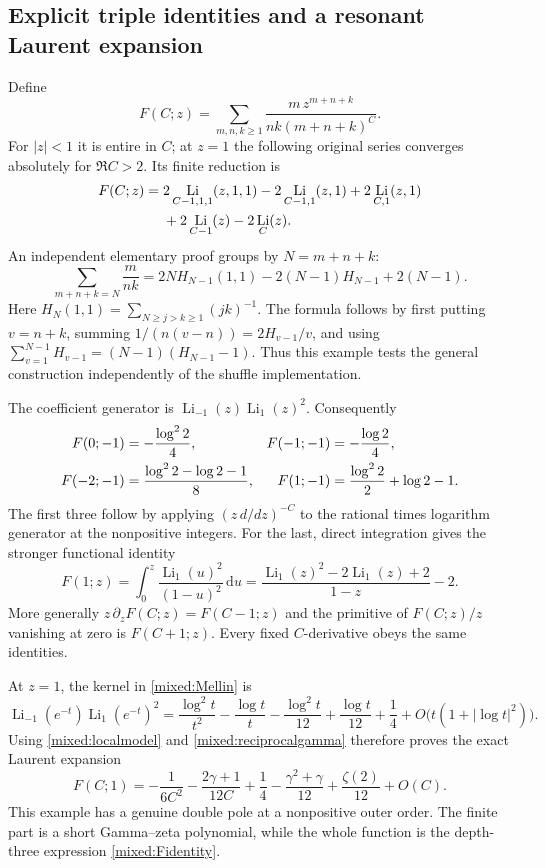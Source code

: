 \documentclass[11pt]{article}
\numberwithin{equation}{section}
\theoremstyle{plain}
\theoremstyle{definition}
\theoremstyle{remark}
\DeclareMathOperator{\Li}{Li}
\newcommand{\dd}{\,\mathrm d}
\begin{document}
\subsection{Explicit triple identities and a resonant Laurent expansion}

Define
\begin{equation}\label{mixed:F}
 F(C;z)=\sum_{m,n,k\ge1}\frac{m\,z^{m+n+k}}{nk(m+n+k)^C}.
\end{equation}
For $|z|<1$ it is entire in $C$; at $z=1$ the following original
series converges absolutely for $\Re C>2$. Its finite reduction is
\begin{align}\label{mixed:Fidentity}
 F(C;z)={}&2\Li_{C-1,1,1}(z,1,1)
          -2\Li_{C-1,1}(z,1)+2\Li_{C,1}(z,1)\notag\\
         &+2\Li_{C-1}(z)-2\Li_C(z).
\end{align}
An independent elementary proof groups by $N=m+n+k$:
\[
 \sum_{m+n+k=N}\frac m{nk}
 =2N H_{N-1}(1,1)-2(N-1)H_{N-1}+2(N-1).
\]
Here $H_N(1,1)=\sum_{N\ge j>k\ge1}(jk)^{-1}$.
The formula follows by first putting $v=n+k$, summing
$1/(n(v-n))=2H_{v-1}/v$, and using
$\sum_{v=1}^{N-1}H_{v-1}=(N-1)(H_{N-1}-1)$.
Thus this example tests the general construction independently of
the shuffle implementation.

The coefficient generator is
$\Li_{-1}(z)\Li_1(z)^2$. Consequently
\begin{align}\label{mixed:Fvalues}
 F(0;-1)&=-\frac{\log^2 2}{4},&
 F(-1;-1)&=-\frac{\log2}{4},\notag\\
 F(-2;-1)&=\frac{\log^2 2-\log2-1}{8},&
 F(1;-1)&=\frac{\log^2 2}{2}+\log2-1.
\end{align}
The first three follow by applying $(z\,d/dz)^{-C}$ to the rational
times logarithm generator at the nonpositive integers. For the last,
direct integration gives the stronger functional identity
\begin{equation}\label{mixed:Fprimitive}
 F(1;z)=\int_0^z\frac{\Li_1(u)^2}{(1-u)^2}\dd u
       =\frac{\Li_1(z)^2-2\Li_1(z)+2}{1-z}-2.
\end{equation}
More generally $z\,\partial_z F(C;z)=F(C-1;z)$ and the primitive
of $F(C;z)/z$ vanishing at zero is $F(C+1;z)$. Every fixed
$C$-derivative obeys the same identities.

At $z=1$, the kernel in \eqref{mixed:Mellin} is
\[
 \Li_{-1}(e^{-t})\Li_1(e^{-t})^2
 =\frac{\log^2t}{t^2}-\frac{\log t}{t}
    -\frac{\log^2t}{12}+\frac{\log t}{12}+\frac14
       +O\bigl(t(1+|\log t|^2)\bigr).
\]
Using \eqref{mixed:localmodel} and \eqref{mixed:reciprocalgamma}
therefore proves the exact Laurent expansion
\begin{equation}\label{mixed:Flaurent}
 \boxed{\displaystyle
 F(C;1)=-\frac1{6C^2}-\frac{2\gamma+1}{12C}
       +\frac14-\frac{\gamma^2+\gamma}{12}
                +\frac{\zeta(2)}{12}+O(C).}
\end{equation}
This example has a genuine double pole at a nonpositive outer order.
The finite part is a short Gamma--zeta polynomial, while the whole
function is the depth-three expression \eqref{mixed:Fidentity}.
\end{document}
